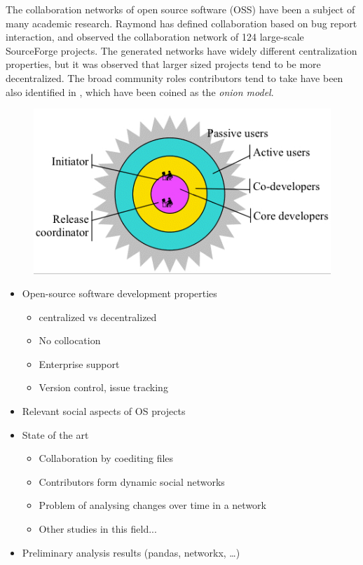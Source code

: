 The collaboration networks of open source software (OSS) have been a subject of many academic research. Raymond \cite{raymondCathedralBazaar1998} has defined collaboration based on bug report interaction, and observed the collaboration network of 124 large-scale SourceForge projects. The generated networks have widely different centralization properties, but it was observed that larger sized projects tend to be more decentralized. The broad community roles contributors tend to take have been also identified in \cite{raymondCathedralBazaar1998}, which have been coined as the \textit{onion model}.

\begin{figure}
    \includegraphics{figures/onion_model.gif}
    \label{The onion model of collaboration types in FLOSS projects}
\end{figure}

\begin{itemize}
    \item Open-source software development properties
    \begin{itemize}
        \item centralized vs decentralized
        \item No collocation
        \item Enterprise support
        \item Version control, issue tracking
    \end{itemize}
    \item Relevant social aspects of OS projects
    \item State of the art
    \begin{itemize}
        \item Collaboration by coediting files
        \item Contributors form dynamic social networks
        \item Problem of analysing changes over time in a network
        \item Other studies in this field...
    \end{itemize}
    \item Preliminary analysis results (pandas, networkx, \dots)
\end{itemize}


